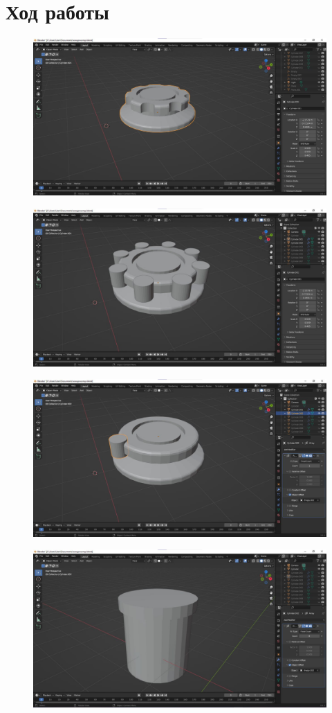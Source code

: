 \documentclass[a4paper,12pt]{article}
\begin{document}
    \section{Ход работы}
    \begin{figure}[H]
        \centering
        \includegraphics[width=0.7\linewidth]{ph1}
    \end{figure}
    \begin{figure}[H]
        \centering
        \includegraphics[width=0.7\linewidth]{ph2}
    \end{figure}
    \begin{figure}[H]
        \centering
        \includegraphics[width=0.7\linewidth]{ph3}
    \end{figure}
    \begin{figure}[H]
        \centering
        \includegraphics[width=0.7\linewidth]{ph4}
    \end{figure}
\end{document}
